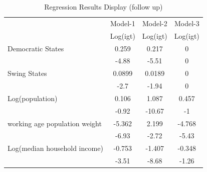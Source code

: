 \begin{table}[htbp]
    \centering
    \caption{Regression Results Display (follow up)}
    \begin{tabular}{p{6.93em}ccc}
        \toprule
        \multicolumn{1}{c}{}          & \multicolumn{1}{p{7.645em}}{Model-1}  & \multicolumn{1}{p{7.5em}}{Model-2}  & \multicolumn{1}{p{8.07em}}{Model-3}  \\
        \multicolumn{1}{c}{}          & \multicolumn{1}{p{7.645em}}{Log(igt)} & \multicolumn{1}{p{7.5em}}{Log(igt)} & \multicolumn{1}{p{8.07em}}{Log(igt)} \\
        \midrule
        Democratic States             & 0.259                                 & 0.217                               & 0                                    \\
        \multicolumn{1}{c}{}          & -4.88                                 & -5.51                               & 0                                    \\
        Swing States                  & 0.0899                                & 0.0189                              & 0                                    \\
        \multicolumn{1}{c}{}          & -2.7                                  & -1.94                               & 0                                    \\
        Log(population)               & 0.106                                 & 1.087                               & 0.457                                \\
        \multicolumn{1}{c}{}          & -0.92                                 & -10.67                              & -1                                   \\
        working age population weight & -5.362                                & 2.199                               & -4.768                               \\
        \multicolumn{1}{c}{}          & -6.93                                 & -2.72                               & -5.43                                \\
        Log(median household income)  & -0.753                                & -1.407                              & -0.348                               \\
        \multicolumn{1}{c}{}          & -3.51                                 & -8.68                               & -1.26                                \\

\end{tabular}
\end{table}
